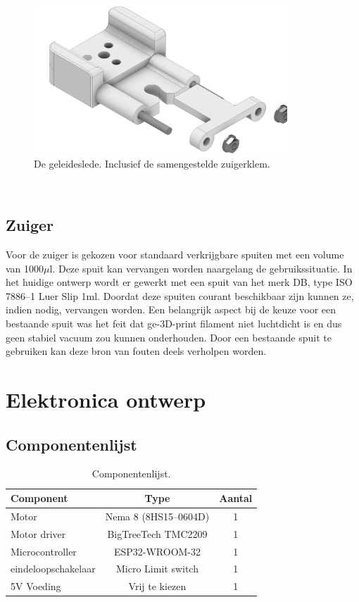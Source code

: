 \begin{minipage}[t]{0.59\textwidth}
    \vspace{0pt}
    \begin{figure}[H]
        \centering
        \includegraphics[width=0.85\textwidth]{figures/CarriageAndClamp.png}
        \caption{De geleideslede. Inclusief de samengestelde zuigerklem.}\label{fig:CarriageAndClamp}
    \end{figure}
\end{minipage}\\

\subsection{Zuiger}
Voor de zuiger is gekozen voor standaard verkrijgbare spuiten met een volume van 1000$\mu$l. Deze spuit kan vervangen worden naargelang de gebruikssituatie. In het huidige ontwerp wordt er gewerkt met een spuit van het merk DB, type ISO 7886--1 Luer Slip 1ml. Doordat deze spuiten courant beschikbaar zijn kunnen ze, indien nodig, vervangen worden.
Een belangrijk aspect bij de keuze voor een bestaande spuit was het feit dat ge-3D-print filament niet luchtdicht is en dus geen stabiel vacuum zou kunnen onderhouden. Door een bestaande spuit te gebruiken kan deze bron van fouten deels verholpen worden.

\section{Elektronica ontwerp}
\subsection{Componentenlijst}
\begin{table}[H]
    \begin{tabular}{l|c|c}
        \textbf{Component} & \textbf{Type} & \textbf{Aantal} \\
        \hline
        Motor & Nema 8 (8HS15--0604D)& 1 \\
        Motor driver & BigTreeTech TMC2209 & 1 \\
        Microcontroller & ESP32-WROOM-32 & 1 \\
        eindeloopschakelaar & Micro Limit switch & 1 \\
        5V Voeding & Vrij te kiezen\footnotemark & 1 \\
        \hline
    \end{tabular}
    \caption{Componentenlijst.}\label{tab:componentenlijst}
\end{table}
